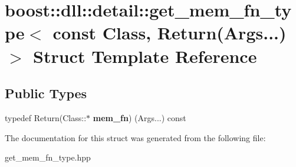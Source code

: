 \hypertarget{a01420}{}\section{boost\+:\+:dll\+:\+:detail\+:\+:get\+\_\+mem\+\_\+fn\+\_\+type$<$ const Class, Return(Args...)$>$ Struct Template Reference}
\label{a01420}
\subsection*{Public Types}
\begin{DoxyCompactItemize}
\item 
\mbox{\label{a01420_a5959c3f9a01a7442da99eb96b6965673}} 
typedef Return(Class\+::$\ast$ {\bfseries mem\+\_\+fn}) (Args...) const
\end{DoxyCompactItemize}


The documentation for this struct was generated from the following file\+:\begin{DoxyCompactItemize}
\item 
get\+\_\+mem\+\_\+fn\+\_\+type.\+hpp\end{DoxyCompactItemize}
